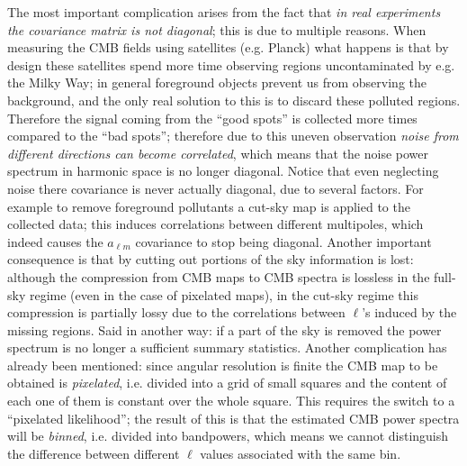 The most important complication arises from the fact that \emph{in real experiments the covariance matrix is not diagonal}; this is due to multiple reasons.
When measuring the CMB fields using satellites (e.g. Planck) what happens is that by design these satellites spend more time observing regions uncontaminated by e.g. the Milky Way; in general foreground objects prevent us from observing the background, and the only real solution to this is to discard these polluted regions. 
Therefore the signal coming from the ``good spots'' is collected more times compared to the ``bad spots''; therefore due to this uneven observation \emph{noise from different directions can become correlated}, which means that the noise power spectrum in harmonic space is no longer diagonal.
Notice that even neglecting noise there covariance is never actually diagonal, due to several factors. For example to remove foreground pollutants a cut-sky map is applied to the collected data; this induces correlations between different multipoles, which indeed causes the $a_{\ell m}$ covariance to stop being diagonal. Another important consequence is that by cutting out portions of the sky information is lost: although the compression from CMB maps to CMB spectra is lossless in the full-sky regime (even in the case of pixelated maps), in the cut-sky regime this compression is partially lossy due to the correlations between $\ell$'s induced by the missing regions. Said in another way: if a part of the sky is removed the power spectrum is no longer a sufficient summary statistics.
Another complication has already been mentioned: since angular resolution is finite the CMB map to be obtained is \emph{pixelated}, i.e. divided into a grid of small squares and the content of each one of them is constant over the whole square. This requires the switch to a ``pixelated likelihood''; the result of this is that the estimated CMB power spectra will be \emph{binned}, i.e. divided into bandpowers, which means we cannot distinguish the difference between different $\ell$ values associated with the same bin. \cite{likelihood_cmb}

